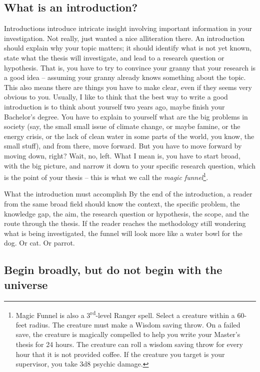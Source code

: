 \documentclass[masters,en,listoffigures,listoftables,acronyms]{NMBU}
\begin{document}
\subsection{What is an introduction?}
Introductions introduce intricate insight involving important information in your investigation.
Not really, just wanted a nice alliteration there.
An introduction should explain why your topic matters; it should identify what is not yet known, state what the thesis will investigate, and lead to a research question or hypothesis.
That is, you have to try to convince your granny that your research is a good idea -- assuming your granny already knows something about the topic.
This also means there are things you have to make clear, even if they seems very obvious to you.
Usually, I like to think that the best way to write a good introduction is to think about yourself two years ago, maybe finish your Bachelor's degree.
You have to explain to yourself what are the big problems in society (say, the small small issue of climate change, or maybe famine, or the energy crisis, or the lack of clean water in some parts of the world, you know, the small stuff), and from there, move forward.
But you have to move forward by moving down, right? Wait, no, left. What I mean is, you have to start broad, with the big picture, and narrow it down to your specific research question, which is the point of your thesis -- this is what we call the \emph{magic funnel}\footnote{Magic Funnel is also a 3\textsuperscript{rd}-level Ranger spell. Select a creature within a 60-feet radius. The creature must make a Wisdom saving throw. On a failed save, the creature is magically compelled to help you write your Master's thesis for 24 hours. The creature can roll a wisdom saving throw for every hour that it is not provided coffee. If the creature you target is your supervisor, you take 3d8 psychic damage.}.

\begin{thesispoint}{What the introduction must accomplish}
By the end of the introduction, a reader from the same broad field should know the context, the specific problem, the knowledge gap, the aim, the research question or hypothesis, the scope, and the route through the thesis.
If the reader reaches the methodology still wondering what is being investigated, the funnel will look more like a water bowl for the dog. Or cat. Or parrot.
\end{thesispoint}

\subsection{Begin broadly, but do not begin with the universe}
\end{document}
